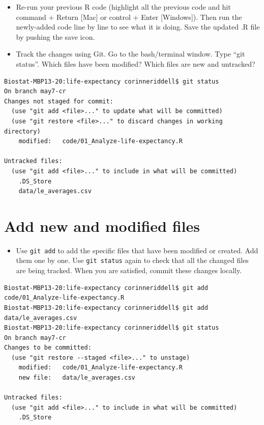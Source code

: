 \documentclass[
]{book}
\providecommand{\tightlist}{%
  \setlength{\itemsep}{0pt}\setlength{\parskip}{0pt}}
\begin{document}
\begin{itemize}
\item
  Re-run your previous R code (highlight all the previous code and hit
  command + Return {[}Mac{]} or control + Enter {[}Windows{]}). Then run the newly-added
  code line by line to see what it is doing. Save the updated .R file by pushing
  the save icon.
\item
  Track the changes using Git. Go to the bash/terminal window. Type ``git status''.
  Which files have been modified? Which files are new and untracked?
\end{itemize}

\begin{verbatim}
Biostat-MBP13-20:life-expectancy corinneriddell$ git status
On branch may7-cr
Changes not staged for commit:
  (use "git add <file>..." to update what will be committed)
  (use "git restore <file>..." to discard changes in working directory)
    modified:   code/01_Analyze-life-expectancy.R

Untracked files:
  (use "git add <file>..." to include in what will be committed)
    .DS_Store
    data/le_averages.csv
\end{verbatim}

\hypertarget{add-new-and-modified-files}{%
\section{Add new and modified files}\label{add-new-and-modified-files}}

\begin{itemize}
\tightlist
\item
  Use \texttt{git\ add} to add the specific files that have been modified or created.
  Add them one by one. Use \texttt{git\ status} again to check that all the changed files
  are being tracked. When you are satisfied, commit these changes locally.
\end{itemize}

\begin{verbatim}
Biostat-MBP13-20:life-expectancy corinneriddell$ git add code/01_Analyze-life-expectancy.R 
Biostat-MBP13-20:life-expectancy corinneriddell$ git add data/le_averages.csv 
Biostat-MBP13-20:life-expectancy corinneriddell$ git status
On branch may7-cr
Changes to be committed:
  (use "git restore --staged <file>..." to unstage)
    modified:   code/01_Analyze-life-expectancy.R
    new file:   data/le_averages.csv

Untracked files:
  (use "git add <file>..." to include in what will be committed)
    .DS_Store
\end{verbatim}
\end{document}
